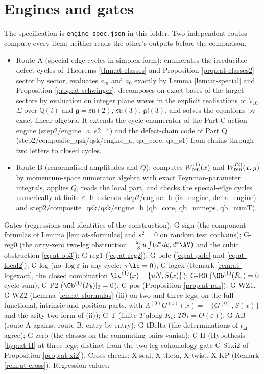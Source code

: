 \section{Engines and gates}
\label{sec:at-engines}

The specification is \texttt{engine\_spec.json} in this folder. Two independent routes compute every item; neither reads the other's outputs before the comparison.
\begin{itemize}
\item Route A (special-edge cycles in simplex form): enumerates the irreducible defect cycles of Theorems \ref{thm:at-classes} and Proposition \ref{prop:at-classes2} sector by sector, evaluates $a_m$ and $a_0$ exactly by Lemma \ref{lem:at-special} and Proposition \ref{prop:at-schwinger}, decomposes on exact bases of the target sectors by evaluation on integer plane waves in the explicit realisations of $V_{10}$, $\Sigma$ over $\mathbb Q(i)$ and $\mathfrak g=\mathfrak{su}(2)$, $\mathfrak{su}(3)$, $\mathfrak{gl}(3)$, and solves the equations by exact linear algebra. It extends the cycle enumerator of the Part-C action engine (step2/engine\_a, s2\_*) and the defect-chain code of Part Q (step2/composite\_qsk/qsk/engine\_a, qa\_core, qa\_s1) from chains through two letters to closed cycles.
\item Route B (renormalised amplitudes and $Q$): computes $W^{(1)}_{\rm ren}(x)$ and $W^{(2)}_{\rm ren}(x,y)$ by momentum-space numerator algebra with exact Feynman-parameter integrals, applies $Q$, reads the local part, and checks the special-edge cycles numerically at finite $\varepsilon$. It extends step2/engine\_b (ia\_engine, delta\_engine) and step2/composite\_qsk/qsk/engine\_b (qb\_core, qb\_numeps, qb\_numT).
\end{itemize}
Gates (regressions and identities of the construction): G-sign (the component formulas of Lemma \ref{lem:at-sformulas} and $s^2=0$ on random test cochains); G-reg0 (the arity-zero two-leg obstruction $-\tfrac{27}8u\int(d^*dc,d^*\AV)$ and the cubic obstruction \eqref{eq:at-ob3}); G-reg1 (\eqref{eq:at-reg2}); G-pole (\eqref{eq:at-pole} and \eqref{eq:at-local2}); G-log (no $\log\varepsilon$ in any cycle; $s\,\lc=0$); G-logex (Remark \ref{rem:at-logexact}, the closed combination $\lc^{(1)}(x)-\{uN,S(x)\}$); G-R0 ($\Ob^{(1)}(R_r)=0$ cycle sum); G-P2 ($\Ob^{(1)}(P_b)|_2=0$); G-pos (Proposition \ref{prop:at-pos}); G-WZ1, G-WZ2 (Lemma \ref{lem:at-sformulas} (iii) on two and three legs, on the full functional, intrinsic and position parts, with $\Lambda^{(0)}G^{(1)}(x)=-\{G^{(0)},S(x)\}$ and the arity-two form of (ii)); G-T (finite $T$ along $K_b$: $T\partial_T=O(\varepsilon)$); G-AB (route A against route B, entry by entry); G-tDelta (the determinations of $t_\Delta$ agree); G-zero (the classes on the commuting pairs vanish); G-H (Hypothesis \ref{hyp:at-H} at three legs; distinct from the two-leg cohomology gate G-S1xi2 of Proposition \ref{prop:at-xi2}). Cross-checks: X-scal, X-theta, X-twist, X-KP (Remark \ref{rem:at-cross}). Regression values:
